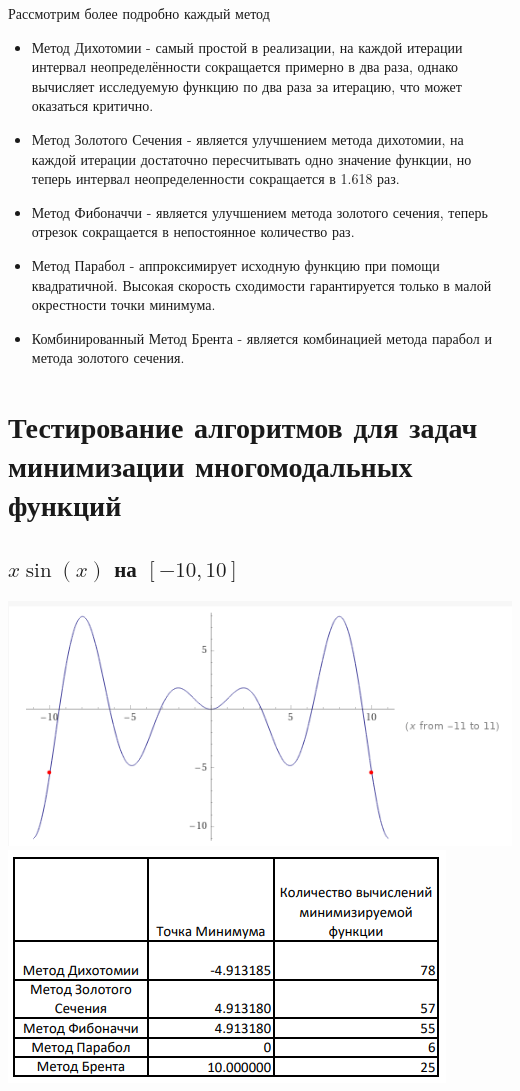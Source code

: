 \documentclass[a4paper,12pt]{article}
\begin{document}
Рассмотрим более подробно каждый метод
\begin{itemize}
\item Метод Дихотомии - самый простой в реализации, на каждой итерации интервал неопределённости сокращается примерно в два раза, однако вычисляет исследуемую функцию по два раза за итерацию, что может оказаться критично.
\item Метод Золотого Сечения - является улучшением метода дихотомии, на каждой итерации достаточно пересчитывать одно значение функции, но теперь интервал неопределенности сокращается в 1.618 раз.
\item Метод Фибоначчи - является улучшением метода золотого сечения, теперь отрезок сокращается в непостоянное количество раз.
\item Метод Парабол - аппроксимирует исходную функцию при помощи квадратичной. Высокая скорость сходимости гарантируется только в малой окрестности точки минимума.
\item Комбинированный Метод Брента - является комбинацией метода парабол и метода золотого сечения.
\end{itemize}

\clearpage

\section{Тестирование алгоритмов для задач минимизации многомодальных функций}
\subsection{$x\sin(x)$ на $[-10, 10]$}
\includegraphics[width=\linewidth]{xsinx1.PNG}
\includegraphics[width=\linewidth]{xsinx2.PNG}
\end{document}
